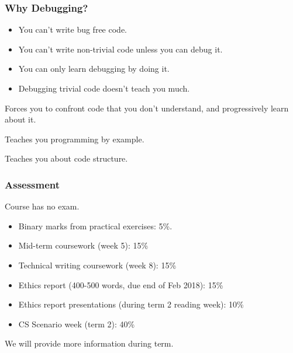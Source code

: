 \documentclass{beamer} %
\begin{document}
\begin{frame}
  \frametitle{Why Debugging?}

  \begin{itemize}
  \item You can't write bug free code.
  \item You can't write non-trivial code unless you can debug it.
  \item You can only learn debugging by doing it.
  \item Debugging trivial code doesn't teach you much.
  \end{itemize}

  Forces you to confront code that you don't understand, and
  progressively learn about it.
  \vspace{2mm}
  \begin{description}
  \item Teaches you programming by example.
  \item Teaches you about code structure.
  \end{description}
\end{frame}

\begin{frame}
  \frametitle{Assessment}

  Course has no exam.
  \begin{itemize}
    \item Binary marks from practical exercises: 5\%.
    \item Mid-term coursework (week 5): 15\%
    \item Technical writing coursework (week 8): 15\%
    \item Ethics report (400-500 words, due end of Feb 2018): 15\%
    \item Ethics report presentations (during term 2 reading week): 10\%
    \item CS Scenario week (term 2): 40\%
  \end{itemize}

We will provide more information during term.

\end{frame}
\end{document}
